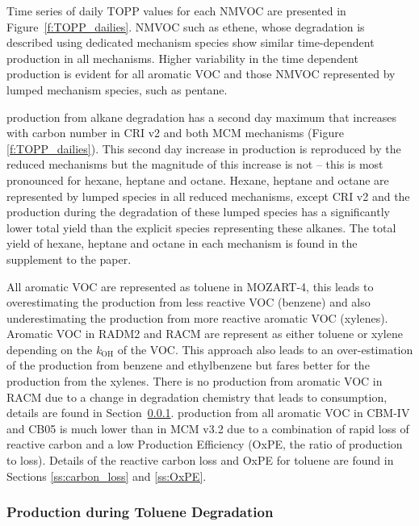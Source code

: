 Time series of daily TOPP values for each NMVOC are presented in \mbox{Figure \ref{f:TOPP_dailies}}. 
NMVOC such as ethene, whose degradation is described using dedicated mechanism species show similar time-dependent  production in all mechanisms.
Higher variability in the time dependent  production is evident for all aromatic VOC and those NMVOC represented by lumped mechanism species, such as pentane.

 production from alkane degradation has a second day maximum that increases with carbon number in CRI v2 and both MCM mechanisms (Figure \ref{f:TOPP_dailies}).
This second day increase in  production is reproduced by the reduced mechanisms but the magnitude of this increase is not -- this is most pronounced for hexane, heptane and octane.
Hexane, heptane and octane are represented by lumped species in all reduced mechanisms, except CRI v2 and the  production during the degradation of these lumped species has a significantly lower total  yield than the explicit species representing these alkanes.
The total  yield of hexane, heptane and octane in each mechanism is found in the supplement to the paper.

All aromatic VOC are represented as toluene in MOZART-4, this leads to overestimating the  production from less reactive VOC (benzene) and also underestimating the  production from more reactive aromatic VOC (xylenes).
Aromatic VOC in RADM2 and RACM are represent as either toluene or xylene depending on the \textit{k}$_{\text{OH}}$ of the VOC.
This approach also leads to an over-estimation of the  production from benzene and ethylbenzene but fares better for the  production from the xylenes.
There is no  production from aromatic VOC in RACM due to a change in degradation chemistry that leads to  consumption, details are found in \mbox{Section \ref{sss:aromatic}}.
 production from all aromatic VOC in CBM-IV and CB05 is much lower than in MCM v3.2 due to a combination of rapid loss of reactive carbon and a low  Production Efficiency (OxPE, the ratio of  production to  loss).
Details of the reactive carbon loss and OxPE for toluene are found in Sections \ref{ss:carbon_loss} and \ref{ss:OxPE}.

\subsubsection[Ox Production during Toluene Degradation]{ Production during Toluene Degradation} \label{sss:aromatic}


